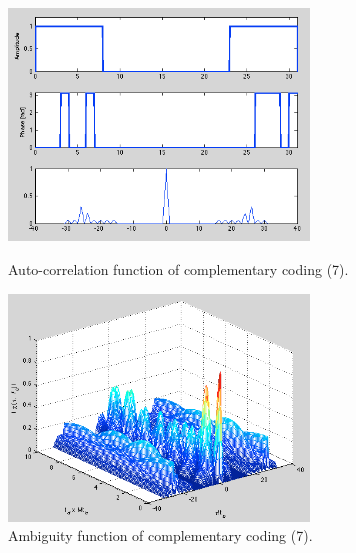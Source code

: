 \documentclass{article}
\begin{document}
\begin{figure}[htb]
\begin{minipage}[t]{0.5\linewidth}
\centering
\includegraphics[width=8cm]{Figures/complementary_data.png}
\caption{Auto-correlation function of complementary coding (7).}
\label{fig:complementary_data}
\end{minipage}
\begin{minipage}[t]{0.5\linewidth}
\centering
\includegraphics[width=8cm]{Figures/complementary_3d.png}
\caption{Ambiguity function of complementary coding (7).}
\label{fig:complementary_3d}
\end{minipage}
\end{figure}
\end{document}
